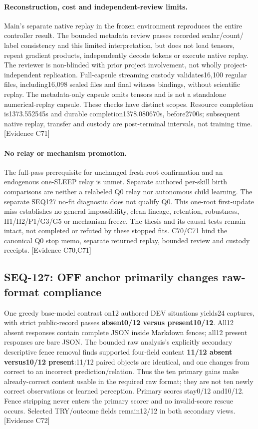 \documentclass[11pt]{article}
\newcommand{\ev}[1]{\textsf{[Evidence #1]}}
\begin{document}
\paragraph{Reconstruction, cost and independent-review limits.}
Main's separate native replay in the frozen environment reproduces the entire
controller result. The bounded metadata review passes recorded scalar/count/
label consistency and this limited interpretation, but does not load tensors,
repeat gradient products, independently decode tokens or execute native replay.
The reviewer is non-blinded with prior project involvement, not wholly
project-independent replication. Full-capsule streaming custody validates16,100
regular files, including16,098 sealed files and final witness bindings, without
scientific replay. The metadata-only capsule omits tensors and is not a standalone
numerical-replay capsule. These checks have distinct scopes. Resource completion
is1373.552545s and durable completion1378.080670s, before2700s; subsequent native
replay, transfer and custody are post-terminal intervals, not training time.
\ev{C71}

\paragraph{No relay or mechanism promotion.}
The full-pass prerequisite for unchanged fresh-root confirmation and an
endogenous one-SLEEP relay is unmet. Separate authored per-skill birth comparisons
are neither a relabeled Q0 relay nor autonomous child learning. The separate
SEQ127 no-fit diagnostic does not qualify Q0. This one-root first-update miss establishes no
general impossibility, clean lineage, retention, robustness, H1/H2/P1/G3/G5 or
mechanism freeze. The thesis and its causal tests remain intact, not completed
or refuted by these stopped fits. C70/C71 bind the canonical Q0 stop memo,
separate returned replay, bounded review and custody receipts. \ev{C70,C71}

\subsection{SEQ-127: OFF anchor primarily changes raw-format compliance}
One greedy base-model contrast on12 authored DEV situations yields24 captures,
with strict public-record passes \textbf{absent0/12 versus present10/12}.
All12 absent responses contain complete JSON inside Markdown fences; all12
present responses are bare JSON. The bounded raw analysis's explicitly
secondary descriptive fence removal finds supported four-field content
\textbf{11/12 absent versus10/12 present}:11/12 paired objects are identical,
and one changes from correct to an incorrect prediction/relation. Thus the ten
primary gains make already-correct content usable in the required raw format;
they are not ten newly correct observations or learned perception. Primary
scores stay0/12 and10/12. Fence stripping never enters the primary scorer and
no invalid-score rescue occurs. Selected TRY/outcome fields remain12/12 in both
secondary views. \ev{C72}
\end{document}
